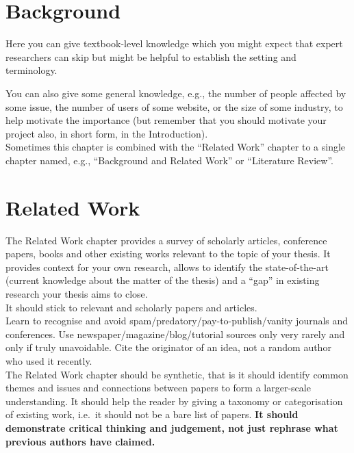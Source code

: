 \documentclass[a4paper,12pt]{Classes/RoboticsLaTeX}
\begin{document}
	\chapter{Background}
	\label{chap:backg}
	
	Here you can give textbook-level knowledge which you might expect that expert researchers can skip but might be helpful to establish the setting and terminology. 
	
	You can also give some general knowledge, e.g., the number of people affected by some issue, the number of users of some website, or the size of some industry, to help motivate the importance (but remember that you should motivate your project also, in short form, in the Introduction).\\
	
	Sometimes this chapter is combined with the ``Related Work'' chapter to a single chapter named, e.g., ``Background and Related Work'' or ``Literature Review''.
	
	\chapter{Related Work}
	\label{chap:rel_work}
	
	The Related Work chapter provides a survey of scholarly articles, conference papers, books and other existing works relevant to the topic of your thesis. It provides context for your own research, allows to identify the state-of-the-art (current knowledge about the matter of the thesis) and a ``gap'' in existing research your thesis aims to close.\\
	
	It should stick to relevant and scholarly papers and articles. \\
	
	Learn to recognise and avoid spam/predatory/pay-to-publish/vanity journals and conferences. Use newspaper/magazine/blog/tutorial sources only very rarely and only if truly unavoidable. Cite the originator of an idea, not a random author who used it recently.\\
			
	The Related Work chapter should be synthetic, that is it should identify common themes and issues and connections between papers to form a larger-scale understanding. It should help the reader by giving a taxonomy or categorisation of existing work, i.e.~it should not be a bare list of papers. \textbf{It should demonstrate critical thinking and judgement, not just rephrase what previous authors have claimed.} \\
			
\end{document}
